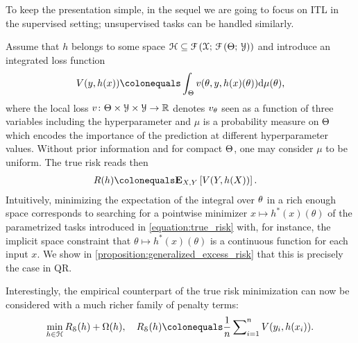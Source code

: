 To keep the presentation simple, in the sequel we are going to focus on
\ac{ITL} in the  supervised setting; unsupervised tasks can be handled
similarly. \par
%
Assume that $h$ belongs to some space $\mathcal{H} \subseteq
\mathcal{F}\left(\mathcal{X};\,
\mathcal{F}\left(\Theta;\,\mathcal{Y}\right)\right)$ and introduce an
integrated loss function
\begin{align}\label{equation:integrated_cost0}
    \cost(y, h(x)) \defeq \displaystyle\int_{\hyperparameterspace}
    \hcost(\hyperparameter,y,
    h(x)(\hyperparameter))\mathrm{d}\mu(\hyperparameter),
\end{align}
where  the local loss $v \colon \Theta \times \mathcal{Y}
\times \mathcal{Y} \to \mathbb{R}$ denotes $v_{\theta}$ seen as a
function of three variables including the hyperparameter and $\mu$ is a
probability measure on $\Theta$ which encodes the importance of
the prediction at different hyperparameter values. Without prior information
and for compact $\Theta$, one may consider $\mu$ to be uniform.
The true risk reads then
\begin{align}\label{equation:h-objective}
   R(h) &\defeq \expectation_{X,Y} \left[ \cost(Y,
    h(X))\right].
\end{align}
Intuitively, minimizing the expectation of the integral over $\theta$
in a rich enough space corresponds to searching for a pointwise minimizer $x
\mapsto h^{*}(x)(\theta)$ of the parametrized tasks introduced in
\cref{equation:true_risk} with, for instance, the implicit space constraint
that $\theta \mapsto h^{*}(x)(\theta)$ is a continuous function for each input
$x$.
We show in \cref{proposition:generalized_excess_risk} that this is
precisely the case in \ac{QR}.\par
Interestingly, the empirical counterpart of the true risk minimization can now
be considered with a much richer family of penalty terms:
{\small\begin{align}\label{equation:h-objective-empir}
    \min_{h\in \hypothesisspace} \empiricalrisk(h) + \Omega(h), \quad
    \empiricalrisk(h) \defeq \frac{1}{n} \sum\nolimits_{i=1}^n \cost(y_i, h(x_i)).
\end{align}}
